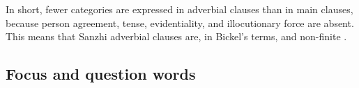 In short, fewer categories are expressed in adverbial clauses than in main clauses, because person agreement, tense, evidentiality, and illocutionary force are absent. This means that Sanzhi adverbial clauses are, in Bickel's terms,  and non-finite \citep{Bickel2010}. 



\subsection{Focus and question words}
\label{ssec:Focus and question words}

